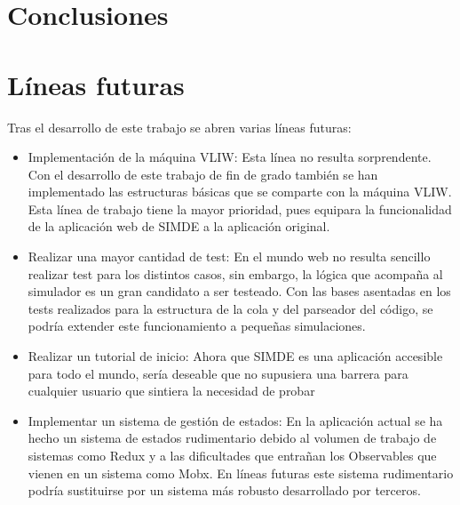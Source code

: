 \section{Conclusiones}
\label{7:sec1}



\section{Líneas futuras}
\label{7:sec2}

Tras el desarrollo de este trabajo se abren varias líneas futuras: 

\begin{itemize}

\item Implementación de la máquina VLIW: Esta línea no resulta sorprendente. Con el desarrollo de este 
trabajo de fin de grado también se han implementado las estructuras básicas que se comparte con la máquina 
VLIW. Esta línea de trabajo tiene la mayor prioridad, pues equipara la funcionalidad de la aplicación web de 
SIMDE a la aplicación original.

\item Realizar una mayor cantidad de test: En el mundo web no resulta sencillo realizar test 
para los distintos casos, sin embargo, la lógica que acompaña al simulador es un gran candidato a 
ser testeado. Con las bases asentadas en los tests realizados para la estructura de la cola y 
del parseador del código, se podría extender este funcionamiento a pequeñas simulaciones.

\item Realizar un tutorial de inicio: Ahora que SIMDE es una aplicación accesible para todo el mundo, sería
deseable que no supusiera una barrera para cualquier usuario que sintiera la necesidad de probar 

\item Implementar un sistema de gestión de estados: En la aplicación actual se ha hecho un sistema
 de estados rudimentario debido al volumen de trabajo de sistemas como Redux y a las dificultades 
 que entrañan los Observables que vienen en un sistema como Mobx. En líneas futuras este sistema
  rudimentario podría sustituirse por un sistema más robusto desarrollado por terceros.

\end{itemize}